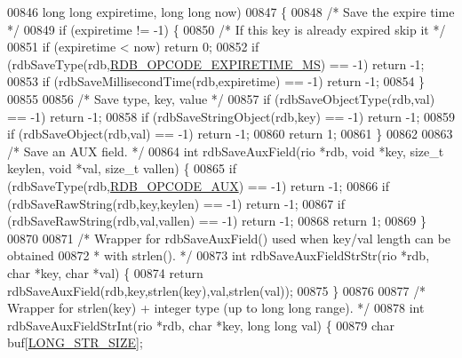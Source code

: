 \begin{DoxyCode}
{{{{{{{{00846                         \textcolor{keywordtype}{long} \textcolor{keywordtype}{long} expiretime, \textcolor{keywordtype}{long} \textcolor{keywordtype}{long} now)
00847 \{
00848     \textcolor{comment}{/* Save the expire time */}
00849     \textcolor{keywordflow}{if} (expiretime != -1) \{
00850         \textcolor{comment}{/* If this key is already expired skip it */}
00851         \textcolor{keywordflow}{if} (expiretime < now) \textcolor{keywordflow}{return} 0;
00852         \textcolor{keywordflow}{if} (rdbSaveType(rdb,\hyperlink{rdb_8h_a718021856b2b0cf1c9c907a3a91a39c4}{RDB\_OPCODE\_EXPIRETIME\_MS}) == -1) \textcolor{keywordflow}{return} -1;
00853         \textcolor{keywordflow}{if} (rdbSaveMillisecondTime(rdb,expiretime) == -1) \textcolor{keywordflow}{return} -1;
00854     \}
00855 
00856     \textcolor{comment}{/* Save type, key, value */}
00857     \textcolor{keywordflow}{if} (rdbSaveObjectType(rdb,val) == -1) \textcolor{keywordflow}{return} -1;
00858     \textcolor{keywordflow}{if} (rdbSaveStringObject(rdb,key) == -1) \textcolor{keywordflow}{return} -1;
00859     \textcolor{keywordflow}{if} (rdbSaveObject(rdb,val) == -1) \textcolor{keywordflow}{return} -1;
00860     \textcolor{keywordflow}{return} 1;
00861 \}
00862 
00863 \textcolor{comment}{/* Save an AUX field. */}
00864 \textcolor{keywordtype}{int} rdbSaveAuxField(rio *rdb, \textcolor{keywordtype}{void} *key, size\_t keylen, \textcolor{keywordtype}{void} *val, size\_t vallen) \{
00865     \textcolor{keywordflow}{if} (rdbSaveType(rdb,\hyperlink{rdb_8h_ab0c62f54bb9377a6a75dbe331a2936bd}{RDB\_OPCODE\_AUX}) == -1) \textcolor{keywordflow}{return} -1;
00866     \textcolor{keywordflow}{if} (rdbSaveRawString(rdb,key,keylen) == -1) \textcolor{keywordflow}{return} -1;
00867     \textcolor{keywordflow}{if} (rdbSaveRawString(rdb,val,vallen) == -1) \textcolor{keywordflow}{return} -1;
00868     \textcolor{keywordflow}{return} 1;
00869 \}
00870 
00871 \textcolor{comment}{/* Wrapper for rdbSaveAuxField() used when key/val length can be obtained}
00872 \textcolor{comment}{ * with strlen(). */}
00873 \textcolor{keywordtype}{int} rdbSaveAuxFieldStrStr(rio *rdb, \textcolor{keywordtype}{char} *key, \textcolor{keywordtype}{char} *val) \{
00874     \textcolor{keywordflow}{return} rdbSaveAuxField(rdb,key,strlen(key),val,strlen(val));
00875 \}
00876 
00877 \textcolor{comment}{/* Wrapper for strlen(key) + integer type (up to long long range). */}
00878 \textcolor{keywordtype}{int} rdbSaveAuxFieldStrInt(rio *rdb, \textcolor{keywordtype}{char} *key, \textcolor{keywordtype}{long} \textcolor{keywordtype}{long} val) \{
00879     \textcolor{keywordtype}{char} buf[\hyperlink{server_8h_a39ec35278876f65fc1ef70b049856ca3}{LONG\_STR\_SIZE}];
}}}}}}}}
\end{DoxyCode}
